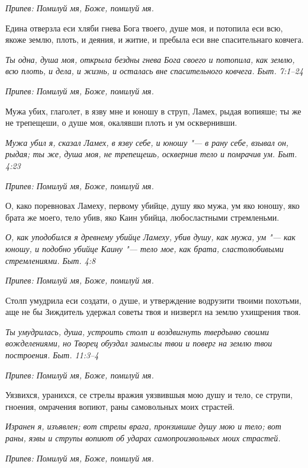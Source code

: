 \itshape Припев:\normalfont{} Помилуй мя, Боже, помилуй мя.


Едина отверзла еси хляби гнева Бога твоего, душе моя, и потопила еси всю, якоже землю, плоть, и деяния, и житие, и пребыла еси вне спасительнаго ковчега.


\itshape Ты одна, душа моя, открыла бездны гнева Бога своего и потопила, как землю, всю плоть, и дела, и жизнь, и осталась вне спасительного ковчега. Быт. 7:1–24\normalfont{}


\itshape Припев:\normalfont{} Помилуй мя, Боже, помилуй мя.


Мужа убих, глаголет, в язву мне и юношу в струп, Ламех, рыдая вопияше; ты же не трепещеши, о душе моя, окалявши плоть и ум осквернивши.


\itshape Мужа убил я, сказал Ламех, в язву себе, и юношу "--- в рану себе, взывал он, рыдая; ты же, душа моя, не трепещешь, осквернив тело и помрачив ум. Быт. 4:23\normalfont{}


\itshape Припев:\normalfont{} Помилуй мя, Боже, помилуй мя.


О, како поревновах Ламеху, первому убийце, душу яко мужа, ум яко юношу, яко брата же моего, тело убив, яко Каин убийца, любосластными стремленьми.


\itshape О, как уподобился я древнему убийце Ламеху, убив душу, как мужа, ум "--- как юношу, и подобно убийце Каину "--- тело мое, как брата, сластолюбивыми стремлениями. Быт. 4:8\normalfont{}


\itshape Припев:\normalfont{} Помилуй мя, Боже, помилуй мя.


Столп умудрила еси создати, о душе, и утверждение водрузити твоими похотьми, аще не бы Зиждитель удержал советы твоя и низвергл на землю ухищрения твоя.


\itshape Ты умудрилась, душа, устроить столп и воздвигнуть твердыню своими вожделениями, но Творец обуздал замыслы твои и поверг на землю твои построения. Быт. 11:3–4\normalfont{}


\itshape Припев:\normalfont{} Помилуй мя, Боже, помилуй мя.


Уязвихся, уранихся, се стрелы вражия уязвившыя мою душу и тело, се струпи, гноения, омрачения вопиют, раны самовольных моих страстей.


\itshape Изранен я, изъявлен; вот стрелы врага, пронзившие душу мою и тело; вот раны, язвы и струпы вопиют об ударах самопроизвольных моих страстей.\normalfont{}


\itshape Припев:\normalfont{} Помилуй мя, Боже, помилуй мя.



